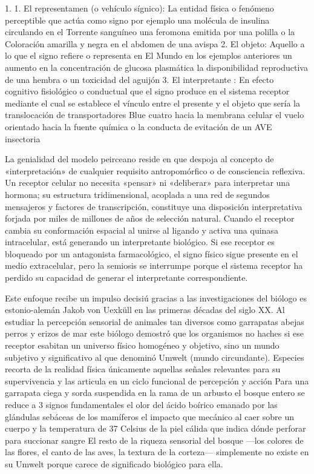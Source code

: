 1. 1.	El representamen (o vehículo sígnico): La entidad física o fenómeno perceptible que actúa como signo por ejemplo una molécula de insulina circulando en el Torrente sanguíneo una feromona emitida por una polilla o la Coloración amarilla y negra en el abdomen de una avispa 
2. El objeto: Aquello a lo que el signo refiere o representa en El Mundo en los ejemplos anteriores un aumento en la concentración de glucosa plasmática la disponibilidad reproductiva de una hembra o un toxicidad del aguijón 
3. El interpretante : En efecto cognitivo fisiológico o conductual que el signo produce en el sistema receptor mediante el cual se establece el vínculo entre el presente y el objeto que sería la translocación de transportadores Blue cuatro hacia la membrana celular el vuelo orientado hacia la fuente química o la conducta de evitación de un AVE insectoria

La genialidad del modelo peirceano reside en que despoja al concepto de «interpretación» de cualquier requisito antropomórfico o de consciencia reflexiva. 
Un receptor celular no necesita «pensar» ni «deliberar» para interpretar una hormona; su estructura tridimensional, acoplada a una red de segundos mensajeros y factores de transcripción, constituye una disposición interpretativa forjada por miles de millones de años de selección natural.
Cuando el receptor cambia su conformación espacial al unirse al ligando y activa una quinasa intracelular, está generando un interpretante biológico. 
Si ese receptor es bloqueado por un antagonista farmacológico, el signo físico sigue presente en el medio extracelular, pero la semiosis se interrumpe porque el sistema receptor ha perdido su capacidad de generar el interpretante correspondiente.

Este enfoque recibe un impulso decisiú gracias a las investigaciones del biólogo es estonio-alemán Jakob von Uexküll en las primeras décadas del siglo XX. 
Al estudiar la percepción sensorial de animales tan diversos como garrapatas abejas perros y erizos de mar este biólogo demostró que los organismos no haches si ese receptor esabitan un universo físico homogéneo y objetivo, sino un mundo subjetivo y significativo al que denominó Umwelt (mundo circundante).
Especies recorta de la realidad física únicamente aquellas señales relevantes para su supervivencia y las articula en un ciclo funcional de percepción y acción 
Para una garrapata ciega y sorda suspendida en la rama de un arbusto el bosque entero se reduce a 3 signos fundamentales el olor del ácido boírico emanado por las glándulas sebáceas de los mamíferos el impacto que mecánico al caer sobre un cuerpo y la temperatura de 37 Celsius de la piel cálida que indica dónde perforar para succionar sangre
El resto de la riqueza sensorial del bosque —los colores de las flores, el canto de las aves, la textura de la corteza— simplemente no existe en su Umwelt porque carece de significado biológico para ella.

